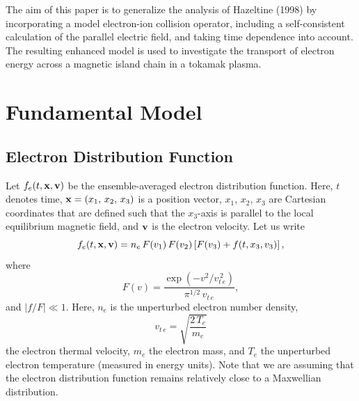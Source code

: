 \documentclass[12pt,prb,aps]{revtex4-1}
\begin{document}
The aim of this paper is to generalize the analysis of Hazeltine (1998) by  incorporating a model electron-ion collision operator,
 including a self-consistent calculation of the parallel electric field, and taking time dependence into account. The resulting enhanced model is used to investigate the transport of electron
 energy across a magnetic island chain in a tokamak plasma. 

\section{Fundamental Model}\label{s2}

\subsection{Electron Distribution Function}
Let $f_e(t,{\bf x},{\bf v})$ be the ensemble-averaged electron distribution function. Here, $t$ denotes time, ${\bf x}=(x_1,\, x_2,\, x_3)$
is a position vector,  $x_1$, $x_2$, $x_3$ are Cartesian coordinates that are defined such that the 
$x_3$-axis is parallel to the local equilibrium magnetic field, and ${\bf v}$ is the electron velocity. 
Let us write
\begin{equation}\label{e22}
f_e(t,{\bf x},{\bf v})= n_e\,F(v_1)\,F(v_2)\left[F(v_3)+ f (t,x_3,v_3)\right],
\end{equation}
where 
\begin{equation}
F(v) = \frac{\exp(-v^2/v_{t\,e}^{\,2})}{\pi^{1/2}\,v_{t\,e}},
\end{equation}
and 
$|f/F|\ll 1$. Here,  $n_e$ is the unperturbed electron number density, 
\begin{equation}\label{vte}
v_{t\,e} = \sqrt{\frac{2\,T_e}{m_e}}
\end{equation}
the electron thermal velocity, $m_e$  the electron mass,  and $T_e$ the unperturbed electron temperature (measured in energy units). Note that we are assuming that the electron distribution function remains relatively close to a Maxwellian distribution. 
\end{document}
